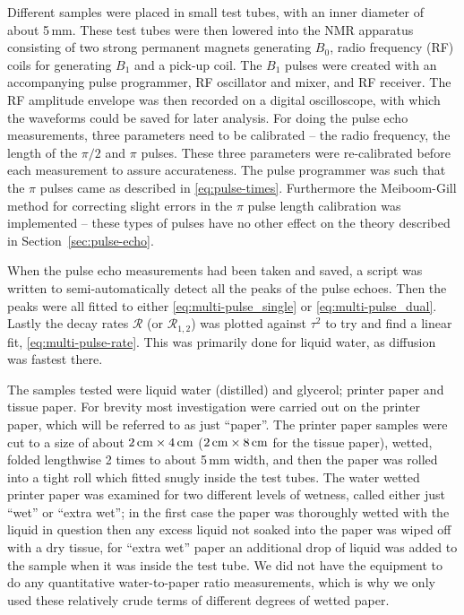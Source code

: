 \documentclass[11pt,a4paper, twocolumn,
swedish, english %
]{article}
\begin{document}
Different samples were placed in small test tubes, with an inner
diameter of about 5\,mm. These test tubes were then lowered into the
NMR apparatus consisting of two strong permanent magnets generating
$B_0$, radio frequency (RF) coils for generating $B_1$ and a pick-up
coil. The $B_1$ pulses were created with an accompanying pulse
programmer, RF oscillator and mixer, and RF receiver. The RF amplitude
envelope was then recorded on a digital oscilloscope, with which the
waveforms could be saved for later analysis. 
For doing the pulse echo measurements, three parameters need to be
calibrated -- the radio frequency, the length of the $\pi/2$ and $\pi$
pulses. These three parameters were re-calibrated before each
measurement to assure accurateness. The pulse programmer was such that
the $\pi$ pulses came as described in
\eqref{eq:pulse-times}. Furthermore the
Meiboom-Gill\cite{Meiboom-Gill1958} method for correcting slight
errors in the $\pi$ pulse length calibration was implemented -- these
types of pulses have no other effect on the theory described in
Section~\ref{sec:pulse-echo}. 

When the pulse echo measurements had been taken and saved, a script
was written to semi-automatically detect all the peaks
of the pulse echoes. Then the peaks were all fitted to either
\eqref{eq:multi-pulse_single} or \eqref{eq:multi-pulse_dual}.
Lastly the decay rates $\mathcal{R}$ (or $\mathcal{R}_{1, 2}$) was
plotted against $\tau^2$ to try and find a linear fit\footnotemark{},
\eqref{eq:multi-pulse-rate}.
This was primarily done for liquid water, as diffusion was fastest
there. 

The samples tested were liquid water (distilled) and glycerol; 
printer paper and tissue paper. For brevity most investigation were
carried out on the printer paper, which will be referred to as just
``paper''. The printer paper samples were cut to a size of about  
$\unit[2]{cm}\times\unit[4]{cm}$ ($\unit[2]{cm}\times\unit[8]{cm}$ for
the tissue paper), wetted, folded lengthwise 2 times to about 5\,mm
width, and then the paper was rolled into a tight roll which fitted
snugly inside the test tubes.
The water wetted printer paper was examined for two different levels of
wetness, called either just ``wet'' or ``extra wet''; in the first
case the paper was thoroughly wetted with the liquid in question then
any excess liquid not soaked into the paper was wiped off with a dry
tissue, for ``extra wet'' paper an additional drop of liquid was added
to the sample when it was inside the test tube. We did not have the
equipment to do any quantitative water-to-paper ratio measurements,
which is why we only used these relatively crude terms of different
degrees of wetted paper.
\end{document}
